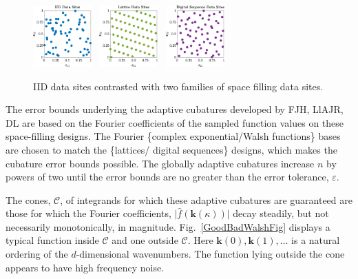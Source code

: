 \documentclass[11pt]{NSFamsart}
\newcommand{\hf}{\widehat{f}}
\newcommand{\bk}{{\boldsymbol{k}}}
\newcommand{\calc}{{\mathcal{C}}}
\newcommand{\bigabs}[1]{\ensuremath{\bigl \lvert #1 \bigr \rvert}}
\begin{document}
\begin{figure} %
	\centering
	\includegraphics[width = 0.20\textwidth]{ProgramsImages/IIDPoints.eps} \ 
	\includegraphics[width = 0.20\textwidth]{ProgramsImages/ShiftedLatticePoints.eps}  \ 
	\includegraphics[width = 0.20\textwidth]{ProgramsImages/SSobolPoints.eps} 
	
	\caption{IID data sites contrasted with two families of space filling data sites.\label{PtsFig}}
\end{figure}

The error bounds underlying the adaptive cubatures developed by FJH, LlAJR, DL are based on the Fourier coefficients of the sampled function values on these space-filling designs.  The Fourier  \{complex exponential/Walsh functions\} bases are chosen to match the \{lattices/ digital sequences\}  designs, which makes the cubature error bounds possible.  The globally adaptive cubatures increase $n$ by powers of two until the error bounds are no greater than the error tolerance, $\varepsilon$.

The cones, $\calc$, of integrands for which these adaptive cubatures are guaranteed are those for which  the Fourier coefficients, $\bigabs{\hf(\bk(\kappa))}$ decay steadily, but not necessarily monotonically, in magnitude.  Fig.\ \ref{GoodBadWalshFig} displays a typical function inside $\calc$ and one outside $\calc$. Here $\bk(0), \bk(1), \ldots$ is a natural ordering of the $d$-dimensional wavenumbers.  The function lying outside the cone appears to have high frequency noise. 
\end{document}
